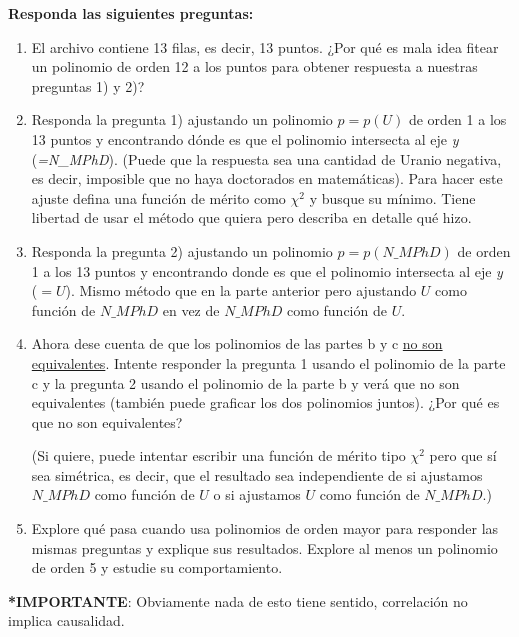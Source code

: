 \documentclass[letter, 11pt]{article}
\begin{document}
\vspace{0.5em}
\noindent\textbf{Responda las siguientes preguntas:}
\renewcommand{\labelenumi}{(\alph{enumi})}
\begin{enumerate}

\item El archivo contiene 13 filas, es decir, 13 puntos. ¿Por qué es mala idea
  fitear un polinomio de orden 12 a los puntos para obtener respuesta a
  nuestras preguntas 1) y 2)?

\item Responda la pregunta 1) ajustando un polinomio $p = p(U)$ de orden 1 a
  los 13 puntos y encontrando dónde es que el polinomio intersecta al eje
  \emph{y} (\emph{=N\_MPhD}). (Puede que la respuesta sea una cantidad de
  Uranio negativa, es decir, imposible que no haya doctorados en matemáticas).
  Para hacer este ajuste defina una función de mérito como $\chi^2$ y busque su
  mínimo. Tiene libertad de usar el método que quiera pero describa en detalle
  qué hizo.

\item Responda la pregunta 2) ajustando un polinomio $p = p(N\_MPhD)$ de orden
  1 a los 13 puntos y encontrando donde es que el polinomio intersecta al eje
  \emph{y} ($=U$). Mismo método que en la parte anterior pero ajustando $U$
  como función de $N\_MPhD$ en vez de $N\_MPhD$ como función de $U$.

\item Ahora dese cuenta de que los polinomios de las partes b y c \underline{no
  son equivalentes}. Intente responder la pregunta 1 usando el polinomio de la
  parte c y la pregunta 2 usando el polinomio de la parte b y verá que no son
  equivalentes (también puede graficar los dos polinomios juntos). ¿Por qué es
  que no son equivalentes?

  (Si quiere, puede intentar escribir una función de mérito tipo $\chi^2$ pero
  que sí sea simétrica, es decir, que el resultado sea independiente de si
  ajustamos $N\_MPhD$ como función de $U$ o si ajustamos $U$ como función de
  $N\_MPhD$.)

\item Explore qué pasa cuando usa polinomios de orden mayor para responder las
  mismas preguntas y explique sus resultados. Explore al menos un polinomio de
  orden 5 y estudie su comportamiento.

\end{enumerate}

\noindent\textbf{*IMPORTANTE}: Obviamente nada de esto tiene sentido,
correlación no implica causalidad.
\end{document}
